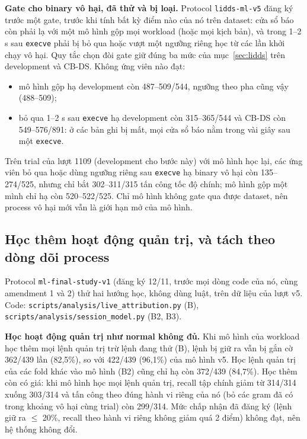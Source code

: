 \textbf{Gate cho binary vô hại, đã thử và bị loại.} Protocol \texttt{lidds-\allowbreak{}ml-\allowbreak{}v5} đăng ký trước một gate, trước khi tính bất kỳ điểm nào của nó trên dataset: cửa sổ báo còn phải lạ với một mô hình gộp mọi workload (hoặc mọi kịch bản), và trong 1--2 s sau \texttt{execve} phải bị bỏ qua hoặc vượt một ngưỡng riêng học từ các lần khởi chạy vô hại. Quy tắc chọn đòi gate giữ đúng ba mức của mục~\ref{sec:lidds} trên development và CB-DS. Không ứng viên nào đạt:

\begin{itemize}
\tightlist
\item
  mô hình gộp hạ development còn 487--509/544, ngưỡng theo pha cũng vậy (488--509);
\item
  bỏ qua 1--2 s sau \texttt{execve} hạ development còn 315--365/544 và CB-DS còn 549--576/891: ở các bản ghi bị mất, mọi cửa sổ báo nằm trong vài giây sau một \texttt{execve}.
\end{itemize}

Trên trial của lượt 1109 (development cho bước này) với mô hình học lại, các ứng viên bỏ qua hoặc dùng ngưỡng riêng sau \texttt{execve} hạ binary vô hại còn 135--274/525, nhưng chỉ bắt 302--311/315 tấn công tốc độ chính; mô hình gộp một mình chỉ hạ còn 520--522/525. Chỉ mô hình không gate qua được dataset, nên process vô hại mới vẫn là giới hạn mở của mô hình.

\subsection{Học thêm hoạt động quản trị, và tách theo dòng dõi process}\label{sec:lineage}

Protocol \texttt{ml-\allowbreak{}final-\allowbreak{}study-\allowbreak{}v1} (đăng ký 12/11, trước mọi dòng code của nó, cùng amendment 1 và 2) thử hai hướng học, không dùng luật, trên dữ liệu của lượt v5. Code: \texttt{scripts/\allowbreak{}analysis/\allowbreak{}live\_\allowbreak{}attribution.py} (B), \texttt{scripts/\allowbreak{}analysis/\allowbreak{}session\_\allowbreak{}model.py} (B2, B3).

\textbf{Học hoạt động quản trị như normal không đủ.} Khi mô hình của workload học thêm mọi lệnh quản trị trừ lệnh đang thử (B), lệnh bị giữ ra vẫn bị gắn cờ 362/439 lần (82,5\%), so với 422/439 (96,1\%) của mô hình v5. Học lệnh quản trị của các fold khác vào mô hình (B2) cũng chỉ hạ còn 372/439 (84,7\%). Học thêm còn có giá: khi mô hình học mọi lệnh quản trị, recall tập chính giảm từ 314/314 xuống 303/314 và tấn công theo đúng hành vi riêng của nó (bỏ các gram đã có trong khoảng vô hại cùng trial) còn 299/314. Mức chấp nhận đã đăng ký (lệnh giữ ra $\le$ 20\%, recall theo hành vi riêng không giảm quá 2 điểm) không đạt, nên hệ thống không đổi.

